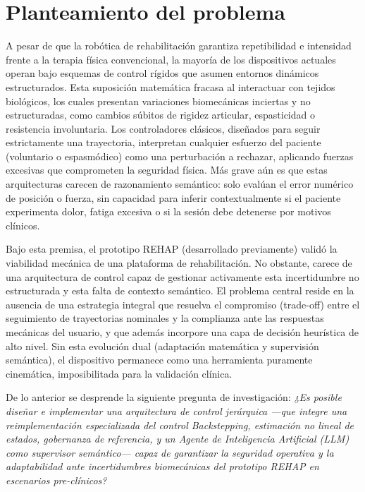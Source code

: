 \documentclass[a4paper,12pt]{article}
\begin{document}
\newpage
\section{Planteamiento del problema}

A pesar de que la robótica de rehabilitación garantiza repetibilidad e intensidad frente a la terapia física convencional, la mayoría de los dispositivos actuales operan bajo esquemas de control rígidos que asumen entornos dinámicos estructurados. Esta suposición matemática fracasa al interactuar con tejidos biológicos, los cuales presentan variaciones biomecánicas inciertas y no estructuradas, como cambios súbitos de rigidez articular, espasticidad o resistencia involuntaria. Los controladores clásicos, diseñados para seguir estrictamente una trayectoria, interpretan cualquier esfuerzo del paciente (voluntario o espasmódico) como una perturbación a rechazar, aplicando fuerzas excesivas que comprometen la seguridad física. Más grave aún es que estas arquitecturas carecen de razonamiento semántico: solo evalúan el error numérico de posición o fuerza, sin capacidad para inferir contextualmente si el paciente experimenta dolor, fatiga excesiva o si la sesión debe detenerse por motivos clínicos.

Bajo esta premisa, el prototipo REHAP (desarrollado previamente) validó la viabilidad mecánica de una plataforma de rehabilitación. No obstante, carece de una arquitectura de control capaz de gestionar activamente esta incertidumbre no estructurada y esta falta de contexto semántico. El problema central reside en la ausencia de una estrategia integral que resuelva el compromiso (trade-off) entre el seguimiento de trayectorias nominales y la complianza ante las respuestas mecánicas del usuario, y que además incorpore una capa de decisión heurística de alto nivel. Sin esta evolución dual (adaptación matemática y supervisión semántica), el dispositivo permanece como una herramienta puramente cinemática, imposibilitada para la validación clínica.

De lo anterior se desprende la siguiente pregunta de investigación: \textit{¿Es posible diseñar e implementar una arquitectura de control jerárquica —que integre una reimplementación especializada del control Backstepping, estimación no lineal de estados, gobernanza de referencia, y un Agente de Inteligencia Artificial (LLM) como supervisor semántico— capaz de garantizar la seguridad operativa y la adaptabilidad ante incertidumbres biomecánicas del prototipo REHAP en escenarios pre-clínicos?}
\end{document}
